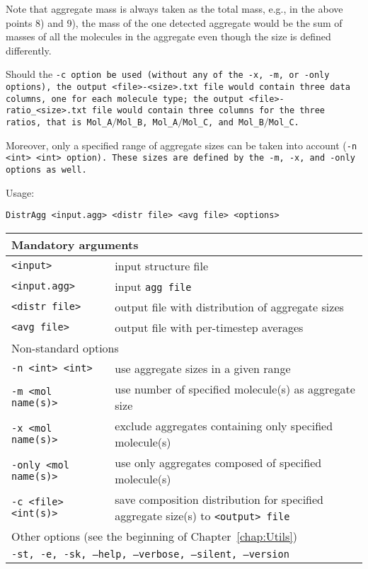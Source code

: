 Note that aggregate mass is always taken as the total mass, e.g., in the
above points 8) and 9), the mass of the one detected aggregate would be the sum
of masses of all the molecules in the aggregate even though the size
is defined differently.

Should the \tt{-c} option be used (without any of the \tt{-x}, \tt{-m}, or
\tt{-only} options), the output \tt{<file>-<size>.txt} file would contain three
data columns, one for each molecule type; the output
\tt{<file>-ratio_<size>.txt} file would contain three columns for the three
ratios, that is \tt{Mol_A}$/$\tt{Mol_B}, \tt{Mol_A}$/$\tt{Mol_C}, and
\tt{Mol_B}$/$\tt{Mol_C}.

Moreover, only a specified range of aggregate sizes can be taken into
account (\tt{-n <int> <int>} option). These sizes are defined by the
\tt{-m}, \tt{-x}, and \tt{-only} options as well.

Usage:

\vspace{1em}
\noindent
\tt{DistrAgg <input.agg> <distr file> <avg file> <options>}

\noindent
\begin{longtable}{p{}p{}}
  \toprule
  \multicolumn{2}{l}{Mandatory arguments} \\
  \midrule
  \tt{<input>} & input structure file \\
  \tt{<input.agg>} & input \tt{agg} file \\
  \tt{<distr file>} & output file with distribution of aggregate
    sizes \\
  \tt{<avg file>} & output file with per-timestep averages \\
  \toprule
  \multicolumn{2}{l}{Non-standard options} \\
  \midrule
  \tt{-n <int> <int>} & use aggregate sizes in a given range \\
  \tt{-m <mol name(s)>} & use number of specified molecule(s) as
    aggregate size \\
  \tt{-x <mol name(s)>} & exclude aggregates containing only specified
    mole\-cule(s) \\
  \tt{-only <mol name(s)>} & use only aggregates composed of specified
    molecule(s) \\
  \tt{-c <file> <int(s)>} & save composition distribution for
    specified aggregate size(s) to \tt{<output>} file \\
  \midrule
  \multicolumn{2}{l}{Other options (see the beginning of 
                     Chapter~\ref{chap:Utils})}\\
  \midrule
  \multicolumn{2}{l}{\tt{-st},
                     \tt{-e},
                     \tt{-sk},
                     \tt{--help},
                     \tt{--verbose},
                     \tt{--silent},
                     \tt{--version}}\\
  \bottomrule
\end{longtable}

